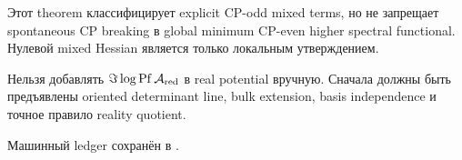 \begin{remark}
Этот theorem классифицирует explicit CP-odd mixed terms, но не запрещает
spontaneous CP breaking в global minimum CP-even higher spectral functional.
Нулевой mixed Hessian является только локальным утверждением.
\end{remark}

\begin{nogocriterion}
Нельзя добавлять $\Im\log\operatorname{Pf}\mathcal A_{\rm red}$ в real
potential вручную. Сначала должны быть предъявлены oriented determinant
line, bulk extension, basis independence и точное правило reality quotient.
\end{nogocriterion}

Машинный ledger сохранён в
.